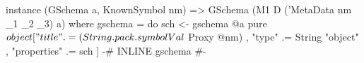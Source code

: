 \begin{code}
instance (GSchema a, KnownSymbol nm)
    => GSchema (M1 D ('MetaData nm _1 _2 _3) a) where
  gschema = do
    sch <- gschema @a
    pure $ object
      [ "title" .= (String . pack . symbolVal $ Proxy @nm)
      , "type"  .= String "object"
      , "properties" .= sch
      ]
  {-# INLINE gschema #-}
\end{code}
